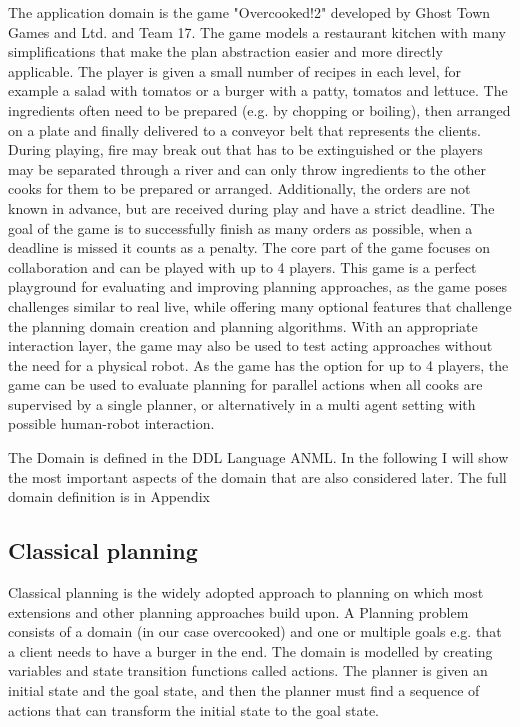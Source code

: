 The application domain is the game "Overcooked!2" developed by Ghost Town Games and Ltd. and Team 17.
The game models a restaurant kitchen with many simplifications that make the plan abstraction easier and more directly applicable.
The player is given a small number of recipes in each level, for example a salad with tomatos or a burger with a patty, tomatos and lettuce.
The ingredients often need to be prepared (e.g. by chopping or boiling), then arranged on a plate and finally delivered to a conveyor belt that represents the clients.
During playing, fire may break out that has to be extinguished or the players may be separated through a river and can only throw ingredients to the other cooks for them to be prepared or arranged.
Additionally, the orders are not known in advance, but are received during play and have a strict deadline.
The goal of the game is to successfully finish as many orders as possible, when a deadline is missed it counts as a penalty.
The core part of the game focuses on collaboration and can be played with up to 4 players.
This game is a perfect playground for evaluating and improving planning approaches, as the game poses challenges similar to real live, while offering many optional features that challenge the planning domain creation and planning algorithms.
With an appropriate interaction layer, the game may also be used to test acting approaches without the need for a physical robot.
As the game has the option for up to 4 players, the game can be used to evaluate planning for parallel actions when all cooks are supervised by a single planner, or alternatively in a multi agent setting with possible human-robot interaction.

The Domain is defined in the DDL Language ANML.
In the following I will show the most important aspects of the domain that are also considered later.
The full domain definition is in Appendix 

\subsection{Classical planning}\label{sec:classical-planning}

Classical planning is the widely adopted approach to planning on which most extensions and other planning approaches build upon.
A Planning problem consists of a domain (in our case overcooked) and one or multiple goals e.g. that a client needs to have a burger in the end.
The domain is modelled by creating variables and state transition functions called actions.
The planner is given an initial state and the goal state, and then the planner must find a sequence of actions that can transform the initial state to the goal state.

